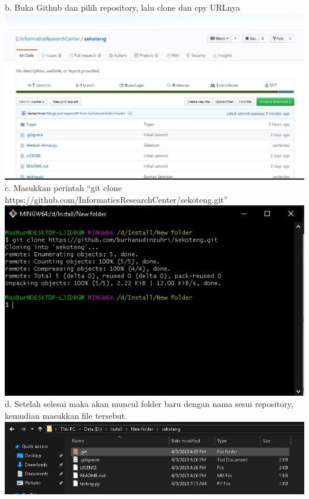 \documentclass{article}
\begin{document}
\begin{enumerate}
                \newline
            	b. Buka Github dan pilih repository, lalu clone dan cpy URLnya
                \newline
                \includegraphics[scale=0.3]{33.3b.jpg}
                \newline
            	c. Masukkan perintah “git clone https://github.com/InformaticsResearchCenter/sekoteng.git”
                \newline
                \includegraphics[scale=0.4]{33.3c.jpg}
                \newline
            	d. Setelah selesai maka akan muncul folder baru dengan nama sesui repository, kemudian masukkan file tersebut.
                \newline
                \includegraphics[scale=0.5]{33.3d.jpg}

\end{enumerate}
\end{document}
